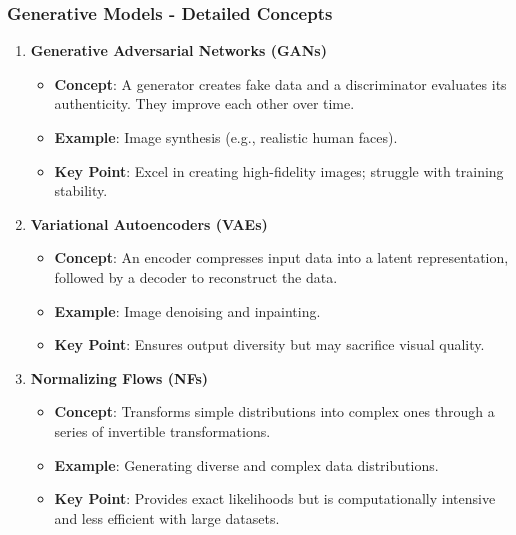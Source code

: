 \documentclass[aspectratio=169]{beamer}
\begin{document}
\begin{frame}[fragile]
    \frametitle{Generative Models - Detailed Concepts}
    
    \begin{enumerate}
        \item \textbf{Generative Adversarial Networks (GANs)}
            \begin{itemize}
                \item \textbf{Concept}: A generator creates fake data and a discriminator evaluates its authenticity. They improve each other over time.
                \item \textbf{Example}: Image synthesis (e.g., realistic human faces).
                \item \textbf{Key Point}: Excel in creating high-fidelity images; struggle with training stability.
            \end{itemize}
        
        \item \textbf{Variational Autoencoders (VAEs)}
            \begin{itemize}
                \item \textbf{Concept}: An encoder compresses input data into a latent representation, followed by a decoder to reconstruct the data.
                \item \textbf{Example}: Image denoising and inpainting.
                \item \textbf{Key Point}: Ensures output diversity but may sacrifice visual quality.
            \end{itemize}
        
        \item \textbf{Normalizing Flows (NFs)}
            \begin{itemize}
                \item \textbf{Concept}: Transforms simple distributions into complex ones through a series of invertible transformations.
                \item \textbf{Example}: Generating diverse and complex data distributions.
                \item \textbf{Key Point}: Provides exact likelihoods but is computationally intensive and less efficient with large datasets.
            \end{itemize}
    \end{enumerate}
\end{frame}
\end{document}
